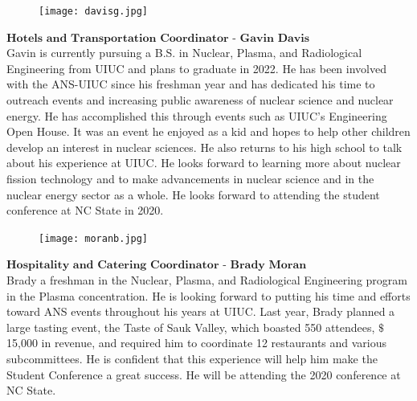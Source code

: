 \setlength\intextsep{0pt}
\begin{figure}
	\begin{center}
		\vspace{-\baselineskip}
		\texttt{[image: davisg.jpg]}
	\end{center}
\end{figure}
$\textbf{Hotels and Transportation Coordinator - Gavin Davis}$\\
Gavin is currently pursuing a B.S. in Nuclear, Plasma, and Radiological Engineering from UIUC and plans to graduate in 2022. He has been involved with the ANS-UIUC since his freshman year and has dedicated his time to outreach events and increasing public awareness of nuclear science and nuclear energy. He has accomplished this through events such as UIUC's Engineering Open House. It was an event he enjoyed as a kid and hopes to help other children develop an interest in nuclear sciences. He also returns to his high school to talk about his experience at UIUC. He looks forward to learning more about nuclear fission technology and to make advancements in nuclear science and in the nuclear energy sector as a whole. He looks forward to attending the student conference at NC State in 2020.

\setlength\intextsep{0pt}
\begin{figure}
	\begin{center}
		\vspace{-\baselineskip}
		\texttt{[image: moranb.jpg]}
	\end{center}
\end{figure}
$\textbf{Hospitality and Catering Coordinator - Brady Moran}$\\
Brady a freshman in the Nuclear, Plasma, and Radiological Engineering program in the Plasma concentration. He is looking forward to putting his time and efforts toward ANS events throughout his years at UIUC. Last year, Brady planned a large tasting event, the Taste of Sauk Valley, which boasted 550 attendees, $\$$15,000 in revenue, and required him to coordinate 12 restaurants and various subcommittees. He is confident that this experience will help him make the Student Conference a great success. He will be attending the 2020 conference at NC State.




